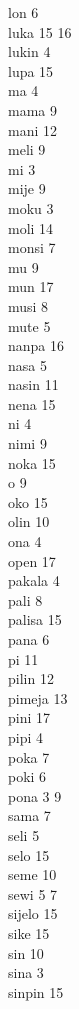 lon 6 \\
luka 15 16 \\
lukin 4 \\
lupa 15 \\
ma 4 \\
mama 9 \\
mani 12 \\
meli 9 \\
mi 3 \\
mije 9 \\
moku 3 \\
moli 14 \\
monsi 7 \\
mu 9 \\
mun 17 \\
musi 8 \\
mute 5 \\
nanpa 16 \\
nasa 5 \\
nasin 11 \\
nena 15 \\
ni 4 \\
nimi 9 \\
noka 15 \\
o 9 \\
oko 15 \\
olin 10 \\
ona 4 \\
open 17 \\
pakala 4 \\
pali 8 \\
palisa 15 \\
pana 6 \\
pi 11 \\
pilin 12 \\
pimeja 13 \\
pini 17 \\
pipi 4 \\
poka 7 \\
poki 6 \\
pona 3 9 \\
sama 7 \\
seli 5 \\
selo 15 \\
seme 10 \\
sewi 5 7 \\
sijelo 15 \\
sike 15 \\
sin 10 \\
sina 3 \\
sinpin 15 \\
